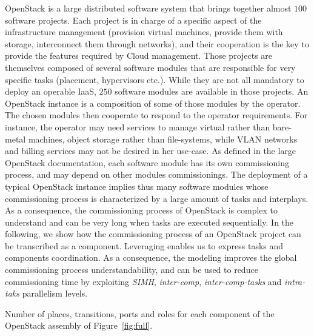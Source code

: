 OpenStack is a large distributed software system that brings together
almost $100$ software projects. Each project is in charge of a
specific aspect of the infrastructure management (\eg provision
virtual machines, provide them with storage, interconnect them through
networks), and their cooperation is the key to provide the features
required by Cloud management.
%
Those projects are themselves composed of several software modules
that are responsible for very specific tasks (\eg placement,
hypervisors etc.). While they are not all mandatory to deploy an
operable IaaS, $250$ software modules are available in those projects.
%
An OpenStack instance is a composition of some of those modules by the
operator. The chosen modules then cooperate to respond to the operator
requirements. For instance, the operator may need services to manage
virtual rather than bare-metal machines, object storage rather than
file-systems, while VLAN networks and billing services may not be
desired in her use-case. As defined in the large OpenStack
documentation, each software module has its own commissioning process,
and may depend on other modules commissionings.
%
The deployment of a typical OpenStack instance implies thus many
software modules whose commissioning process is characterized by a
large amount of tasks and interplays. As a consequence, the
commissioning process of OpenStack is complex to understand and can be
very long when tasks are executed sequentially.
%
In the following, we show how the commissioning process of an
OpenStack project can be transcribed as a \mad component. Leveraging
\mad enables us to express tasks and components coordination. As a
consequence, the \mad modeling improves the global commissioning
process understandability, and can be used to reduce commissioning
time by exploiting \emph{SIMH}, \emph{inter-comp}, \emph{inter-comp-tasks}
and \emph{intra-taks} parallelism levels.

\begin{table}
  \begin{center}
    
    \caption{Number of places, transitions, ports and roles for each \mad component
        of the OpenStack assembly of Figure~\ref{fig:full}.}
    \label{tab:os}
  \end{center}
\end{table}


